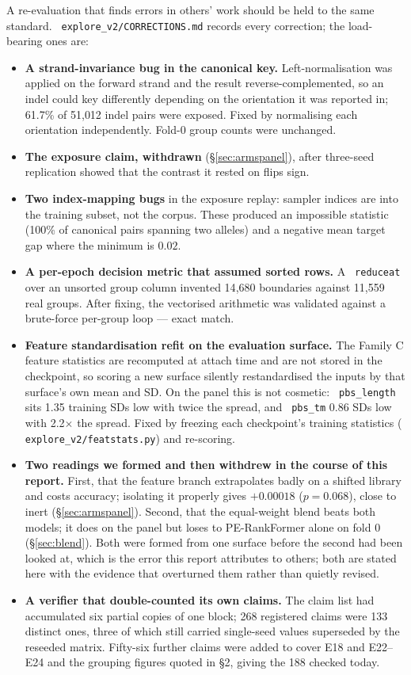 \documentclass[11pt]{article}
\newcommand{\code}[1]{\texttt{\small\begingroup\hyphenpenalty=10000 #1\endgroup}}
\begin{document}
A re-evaluation that finds errors in others' work should be held to the same standard.
\code{explore\_v2/CORRECTIONS.md} records every correction; the load-bearing ones are:

\begin{itemize}\itemsep3pt
\item \textbf{A strand-invariance bug in the canonical key.} Left-normalisation was applied on
the forward strand and the result reverse-complemented, so an indel could key differently
depending on the orientation it was reported in; 61.7\% of 51{,}012 indel pairs were exposed.
Fixed by normalising each orientation independently. Fold-0 group counts were unchanged.
\item \textbf{The exposure claim, withdrawn} (\S\ref{sec:armspanel}), after three-seed
replication showed that the contrast it rested on flips sign.
\item \textbf{Two index-mapping bugs} in the exposure replay: sampler indices are into the
training subset, not the corpus. These produced an impossible statistic (100\% of canonical
pairs spanning two alleles) and a negative mean target gap where the minimum is $0.02$.
\item \textbf{A per-epoch decision metric that assumed sorted rows.} A \code{reduceat} over an
unsorted group column invented 14{,}680 boundaries against 11{,}559 real groups. After fixing,
the vectorised arithmetic was validated against a brute-force per-group loop --- exact match.
\item \textbf{Feature standardisation refit on the evaluation surface.} The Family C feature
statistics are recomputed at attach time and are not stored in the checkpoint, so scoring a new
surface silently restandardised the inputs by that surface's own mean and SD. On the panel this
is not cosmetic: \code{pbs\_length} sits 1.35 training SDs low with twice the spread, and
\code{pbs\_tm} 0.86 SDs low with 2.2$\times$ the spread. Fixed by freezing each checkpoint's
training statistics (\code{explore\_v2/featstats.py}) and re-scoring.
\item \textbf{Two readings we formed and then withdrew in the course of this report.}
First, that the feature branch extrapolates badly on a shifted library and costs accuracy;
isolating it properly gives $+0.00018$ ($p = 0.068$), close to inert
(\S\ref{sec:armspanel}). Second, that the equal-weight blend beats both models; it does on
the panel but loses to PE-RankFormer alone on fold 0 (\S\ref{sec:blend}). Both were formed
from one surface before the second had been looked at, which is the error this report
attributes to others; both are stated here with the evidence that overturned them rather
than quietly revised.

\item \textbf{A verifier that double-counted its own claims.} The claim list had accumulated
six partial copies of one block; 268 registered claims were 133 distinct ones, three of which
still carried single-seed values superseded by the reseeded matrix. Fifty-six further claims
were added to cover E18 and E22--E24 and the grouping figures quoted in \S2, giving the 188
checked today.
\end{itemize}
\end{document}
